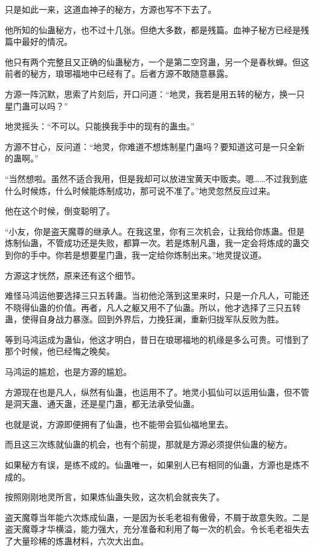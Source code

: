 \begin{this_body}
只是如此一来，这道血神子的秘方，方源也写不下去了。

他所知的仙蛊秘方，也不过十几张。但绝大多数，都是残篇。血神子秘方已经是残篇中最好的情况。

他只有两个完整且又正确的仙蛊秘方，一个是第二空窍蛊，另一个是春秋蝉。但这前者的秘方，琅琊福地中已经有了。后者方源不敢随意暴露。

方源一阵沉默，思索了片刻后，开口问道：“地灵，我若是用五转的秘方，换一只星门蛊可以吗？”

地灵摇头：“不可以。只能换我手中的现有的蛊虫。”

方源不甘心，反问道：“地灵，你难道不想炼制星门蛊吗？要知道这可是一只全新的蛊啊。”

“当然想啦。虽然不适合我用，但是我却可以放进宝黄天中贩卖。嗯……不过我到底什么时候炼，什么时候能炼制成功，那可说不准了。”地灵忽然反应过来。

他在这个时候，倒变聪明了。

“小友，你是盗天魔尊的继承人。在我这里，你有三次机会，让我给你炼蛊。但是炼制仙蛊，不管成功还是失败，都算一次。若是炼制凡蛊，我一定会将炼成的蛊交到你的手中。你若是想要星门蛊，我一定给你炼制出来。”地灵提议道。

方源这才恍然，原来还有这个细节。

难怪马鸿运他要选择三只五转蛊。当初他沦落到这里来时，只是一介凡人，可能还不晓得仙蛊的价值。再者，凡人之躯又用不了仙蛊。所以，他才选择了三只五转蛊，使得自身战力暴涨。回到外界后，力挽狂澜，重新归拢军队反败为胜。

等到马鸿运成为蛊仙，他这才明白，昔日在琅琊福地的机缘是多么可贵。可惜到了那个时候，他已经悔之晚矣。

马鸿运的尴尬，也是方源的尴尬。

方源现在也是凡人，纵然有仙蛊，也运用不了。地灵小狐仙可以运用仙蛊，但不管是洞天蛊、通天蛊，还是星门蛊，都无法承受仙蛊。

也就是说，方源即便拥有了仙蛊，也不能带会狐仙福地里去。

而且这三次练就仙蛊的机会，也有个前提，那就是方源必须提供仙蛊的秘方。

如果秘方有误，是练不成的。仙蛊唯一，如果别人已有相同的仙蛊，方源也是炼不成的。

按照刚刚地灵所言，如果炼仙蛊失败，这次机会就丧失了。

盗天魔尊当年能六次炼成仙蛊，一是因为长毛老祖有傲骨，不屑于故意失败。二是盗天魔尊才华横溢，能力强大，充分准备和利用了每一次的机会。令长毛老祖失去了大量珍稀的炼蛊材料，六次大出血。


\end{this_body}
